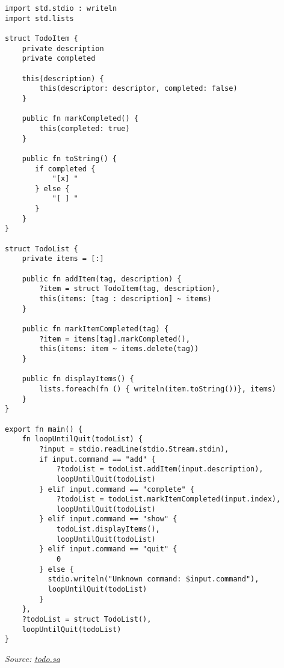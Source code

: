 \begin{verbatim}
import std.stdio : writeln
import std.lists

struct TodoItem {
    private description
    private completed

    this(description) {
        this(descriptor: descriptor, completed: false)
    }

    public fn markCompleted() {
        this(completed: true)
    }

    public fn toString() {
       if completed {
           "[x] "
       } else {
           "[ ] "
       }
    }
}

struct TodoList {
    private items = [:]

    public fn addItem(tag, description) {
        ?item = struct TodoItem(tag, description),
        this(items: [tag : description] ~ items)
    }

    public fn markItemCompleted(tag) {
        ?item = items[tag].markCompleted(),
        this(items: item ~ items.delete(tag))
    }

    public fn displayItems() {
        lists.foreach(fn () { writeln(item.toString())}, items)
    }
}

export fn main() {
    fn loopUntilQuit(todoList) {
        ?input = stdio.readLine(stdio.Stream.stdin),
        if input.command == "add" {
            ?todoList = todoList.addItem(input.description),
            loopUntilQuit(todoList)
        } elif input.command == "complete" {
            ?todoList = todoList.markItemCompleted(input.index),
            loopUntilQuit(todoList)
        } elif input.command == "show" {
            todoList.displayItems(),
            loopUntilQuit(todoList)
        } elif input.command == "quit" {
            0
        } else {
          stdio.writeln("Unknown command: $input.command"),
          loopUntilQuit(todoList)
        }
    },
    ?todoList = struct TodoList(),
    loopUntilQuit(todoList)
}
\end{verbatim}

\emph{Source: \href{../grammar/todo.sa}{todo.sa}}
